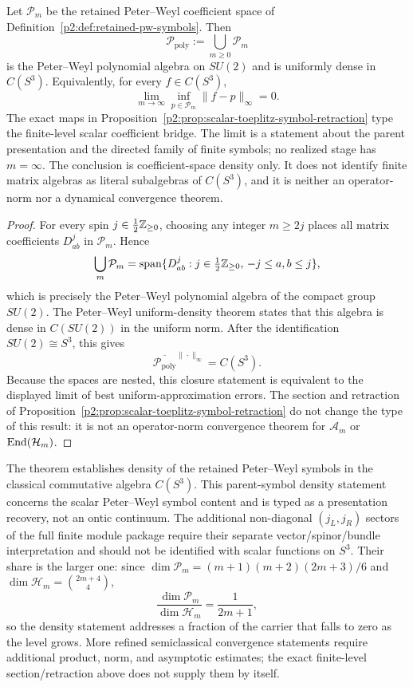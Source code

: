 \documentclass[12pt,a4paper]{article}
\begin{document}
\begin{theorem}
\label{p2:thm:continuum_limit}
Let $\mathcal P_m$ be the retained Peter--Weyl coefficient space of Definition~\ref{p2:def:retained-pw-symbols}. Then
\[
\mathcal P_{\mathrm{poly}}:=\bigcup_{m\ge0}\mathcal P_m
\]
is the Peter--Weyl polynomial algebra on $SU(2)$ and is uniformly dense in
$C(S^3)$.  Equivalently, for every \(f\in C(S^3)\),
\[
 \lim_{m\to\infty}
 \inf_{p\in\mathcal P_m}\|f-p\|_\infty=0.
\]
The exact maps in
Proposition~\ref{p2:prop:scalar-toeplitz-symbol-retraction} type the
finite-level scalar coefficient bridge.  The limit is a statement about the
parent presentation and the directed family of finite symbols; no realized
stage has \(m=\infty\).  The conclusion is coefficient-space density only.  It
does not identify finite matrix algebras as literal subalgebras of
\(C(S^3)\), and it is neither an operator-norm nor a dynamical convergence
theorem.
\end{theorem}

\begin{proof}
For every spin \(j\in\frac12\mathbb{Z}_{\ge0}\), choosing any integer \(m\ge 2j\)
places all matrix coefficients \(D^j_{ab}\) in \(\mathcal P_m\).  Hence
\[
\bigcup_m\mathcal P_m
=
\operatorname{span}\{D^j_{ab}:j\in\tfrac12\mathbb{Z}_{\ge0},\,-j\le a,b\le j\},
\]
which is precisely the Peter--Weyl polynomial algebra of the compact group
\(SU(2)\).  The Peter--Weyl uniform-density theorem
\cite{Peter1927,helgason1984groups} states that this algebra is dense in
\(C(SU(2))\) in the uniform norm.  After the identification
\(SU(2)\cong S^3\), this gives
\[
\overline{\mathcal P_{\mathrm{poly}}}^{\|\cdot\|_\infty}=C(S^3).
\]
Because the spaces are nested, this closure statement is equivalent to the
displayed limit of best uniform-approximation errors.  The section and
retraction of
Proposition~\ref{p2:prop:scalar-toeplitz-symbol-retraction} do not change the
type of this result: it is not an operator-norm convergence theorem for
\(\mathcal A_m\) or \(\operatorname{End}(\mathcal H_m)\).
\end{proof}

\begin{remark}
\label{p2:rem:continuum-mode}
The theorem establishes density of the retained Peter--Weyl symbols in the
classical commutative algebra $C(S^3)$.  This parent-symbol density statement concerns the scalar Peter--Weyl symbol content and is typed as a presentation recovery, not an ontic continuum.  The additional non-diagonal
$(j_L,j_R)$ sectors of the full finite module package require their separate
vector/spinor/bundle interpretation and should not be identified with scalar
functions on $S^3$.  Their share is the larger one: since
$\dim\mathcal P_m=(m+1)(m+2)(2m+3)/6$ and
$\dim\mathcal H_m=\binom{2m+4}{4}$,
\[
 \frac{\dim\mathcal P_m}{\dim\mathcal H_m}=\frac{1}{2m+1},
\]
so the density statement addresses a fraction of the carrier that falls to
zero as the level grows.  More refined semiclassical convergence statements require
additional product, norm, and asymptotic estimates; the exact finite-level
section/retraction above does not supply them by itself.
\end{remark}
\end{document}
